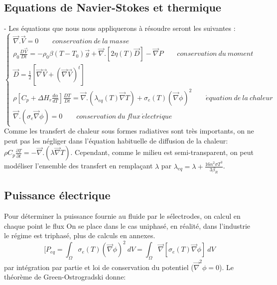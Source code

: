 \documentclass[12pt, a4paper, french, BCOR = 0pt, DIV = 10]{scrartcl}
\begin{document}
    \subsection{ Equations de Navier-Stokes et thermique}
    - Les équations que nous nous appliquerons à résoudre seront les suivantes : \\
    $$
    \left\{
    \begin{array} {ll} 
        \vec {\nabla}. \vec{V} = 0  ~~~~~~~~~  conservation~de~la~masse\\
        
        \rho_{0} \frac{D\vec{V}}{Dt} = -\rho_{0} \beta (T-T_{0}) \vec{g} + \vec {\nabla} . [ 2 \eta (T) \vec{D}] - \vec {\nabla} P  ~~~~~~~~~ conservation~du~moment \\   
        
        \vec{D} = \frac{1}{2} [\vec{\nabla} \vec{V} + (\vec{\nabla} \vec{V})^t ] \\
        \rho [ C_{p}+ \Delta H_{r} \frac{d\alpha}{dT}] \frac{DT}{Dt} = \vec {\nabla} .  (\lambda_{eq}(T) \vec{\nabla} T ) + \sigma_{e}(T) (\vec \nabla\phi)^2  ~~~~~~~~~ \acute equation~de ~la~chaleur \\
        
        \vec{\nabla} . (\sigma_{e} \vec{\nabla} \phi) = 0  ~~~~~~~~~ conservation~du~flux~ \acute electrique
        
        
    \end{array}
    \right. 
    $$
    Comme les transfert de chaleur sous formes radiatives sont très importants, on ne peut pas les négliger dans l'équation habituelle de diffusion de la chaleur: $ \rho C_{p} \frac{\partial T}{\partial t} = - \vec{\nabla} . (\lambda\vec{\nabla}T) $. Cependant, comme le milieu est semi-transparent, on peut modéliser l'ensemble des transfert en remplaçant $\lambda$ par $\lambda_{eq} = \lambda + \frac{16n^{2} \sigma T^{3}}{3\beta_{R}} $.
    \\ [0.5 cm]
    
    
    \subsection{Puissance électrique}
    Pour déterminer la puissance fournie au fluide par le sélectrodes, on calcul en chaque point le flux 
    On se place dans le cas uniphasé, en réalité, dans l'industrie le régime est triphasé, plus de calculs en annexes. \\ [0.2 cm ]
    $$
    [ P_{eq}=\int_\Omega \sigma_{e}(T)(\vec \nabla\phi)^2~dV  = \int_\Omega \vec \nabla[\sigma_{e}(T)\vec \nabla\phi]~dV
    $$
    par intégration par partie et loi de conservation du potentiel ($ \vec{\nabla}^2 \phi = 0 $). Le théorème de Green-Ostrogradski donne: 
    
\end{document}
